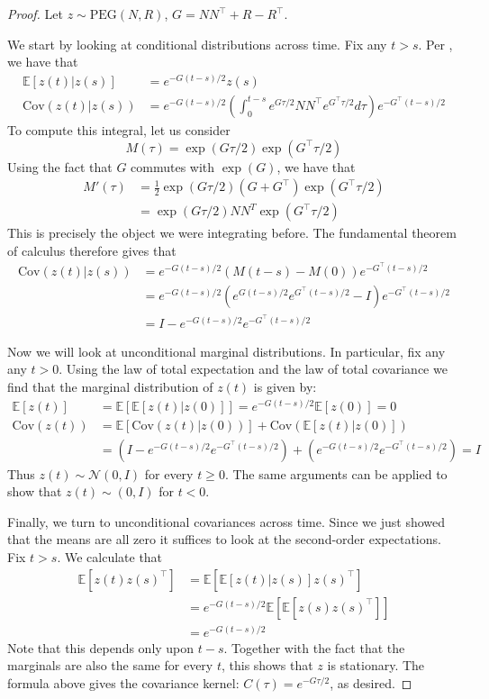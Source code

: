 \documentclass{article}
\theoremstyle{definition}
\newcommand{\PEG}{\mathrm{PEG}}
\newcommand{\Cov}{\mathrm{Cov}}
\begin{document}
\begin{proof}
Let $z \sim \PEG(N,R)$, $G=N N^\top + R-R^\top$.  

We start by looking at conditional distributions across time.  Fix any $t>s$.  Per \cite{vatiwutipong2019alternative}, we have that 
\begin{align*}
\mathbb{E}[z(t)|z(s)] &= e^{-G(t-s)/2}z(s) \\
\Cov(z(t)|z(s)) &= e^{-G(t-s)/2} \left( \int_0^{t-s} e^{G \tau/2} NN^\top e^{G^\top \tau /2} d\tau \right) e^{-G^\top(t-s)/2}
\end{align*}
To compute this integral, let us consider 
\[
M(\tau) = \exp(G\tau/2)\exp(G^\top \tau/2)
\]
Using the fact that $G$ commutes with $\exp(G)$, we have that 
\begin{align*}
M'(\tau) &=  \frac{1}{2}\exp(G \tau/2)(G+G^\top)\exp(G^\top \tau/2)\\
      &= \exp(G\tau/2)NN^T\exp(G^\top \tau/2)
\end{align*}
This is precisely the object we were integrating before.  The fundamental theorem of calculus therefore gives that 
\begin{align*}
\Cov(z(t)|z(s)) &= e^{-G(t-s)/2} (M(t-s)-M(0)) e^{-G^\top(t-s)/2}\\
&= e^{-G(t-s)/2} (e^{G(t-s)/2}e^{G^\top (t-s)/2}-I) e^{-G^\top(t-s)/2} \\
&= I - e^{-G(t-s)/2} e^{-G^\top(t-s)/2}
\end{align*}

Now we will look at unconditional marginal distributions.  In particular, fix any any $t>0$.  Using the law of total expectation and the law of total covariance we find that the marginal distribution of $z(t)$ is given by:
\begin{align*}
\mathbb{E}[z(t)] &= 
  \mathbb{E}[\mathbb{E}[z(t)|z(0)]]
  =e^{-G(t-s)/2}\mathbb{E}[z(0)]=0 \\
\Cov(z(t)) &= \mathbb{E}\left[\Cov(z(t)|z(0))\right] 
            + \Cov(\mathbb{E}[z(t)|z(0)])\\
           &=  (I - e^{-G(t-s)/2} e^{-G^\top(t-s)/2}) + (e^{-G(t-s)/2} e^{-G^\top(t-s)/2}) = I
\end{align*}
Thus $z(t)\sim \mathcal{N}(0,I)$ for every $t\geq 0$.  The same arguments can be applied to show that $z(t) \sim (0,I)$ for $t<0$.

Finally, we turn to unconditional covariances across time.  Since we just showed that the means are all zero it suffices to look at the second-order expectations.  Fix $t>s$.  We calculate that 
\begin{align*}
\mathbb{E}[z(t) z(s)^\top] 
  &= \mathbb{E}[\mathbb{E}[z(t)|z(s)] z(s)^\top]\\ 
  &= e^{-G(t-s)/2}\mathbb{E}[\mathbb{E}[z(s) z(s)^\top]] \\
  &= e^{-G(t-s)/2}
\end{align*}
Note that this depends only upon $t-s$.  Together with the fact that the marginals are also the same for every $t$, this shows that $z$ is stationary.   The formula above gives the covariance kernel: $C(\tau) = e^{-G\tau/2}$, as desired.
\end{proof}
\end{document}
